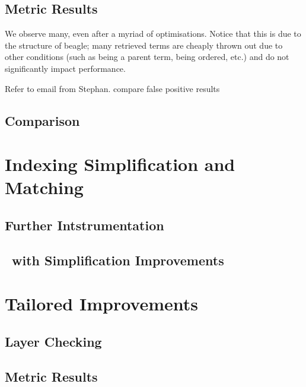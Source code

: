 \subsection{Metric Results}

We observe many, even after a myriad of optimisations. Notice
that this is due to the structure of beagle; many retrieved terms
are cheaply thrown out due to other conditions (such as being a parent
term, being ordered, etc.) and do not significantly impact performance.

Refer to email from Stephan. compare false positive results


\subsection{Comparison}

\section{Indexing Simplification and Matching}

\subsection{Further Intstrumentation}
\label{section:instr2}

\subsection{\Beagle\ with Simplification Improvements}

\section{Tailored Improvements}
\label{sec:tailresults}

\subsection{Layer Checking}

\subsection{Metric Results}



